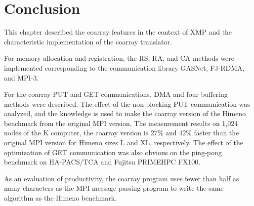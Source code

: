 ﻿\section{Conclusion}\label{sec:concl}

This chapter described the coarray features in the context of XMP and 
the characteristic implementation of the coarray translator.

For memory allocation and registration, the RS, RA, and CA methods were
implemented corresponding to the communication library GASNet, FJ-RDMA,
and MPI-3.

For the coarray PUT and GET communications, DMA and four buffering methods
were described. The effect of the non-blocking PUT communication was
analyzed, and the knowledge is used to make the coarray version of the Himeno benchmark
from the original MPI version.
The measurement results on 1,024 nodes of the K computer, the coarray version 
is 27\% and 42\% faster than the original MPI version for Himeno sizes
L and XL, respectively.
The effect of the optimization of GET communication was also obvious on 
the ping-pong benchmark on HA-PACS/TCA and Fujitsu PRIMEHPC FX100.

As an evaluation of productivity, the coarray program uses fewer than half as
many characters as the MPI message passing program to write the same algorithm
as the Himeno benchmark.

